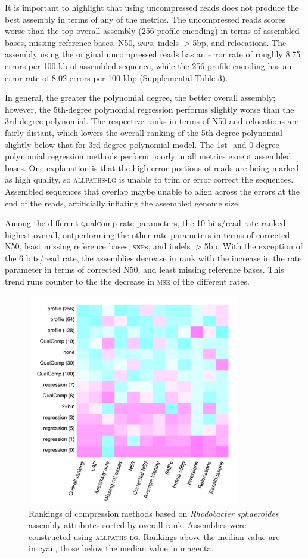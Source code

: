\documentclass{bioinfo}
\begin{document}
It is important to highlight that using uncompressed reads does not
produce the best assembly in terms of any of the metrics. The
uncompressed reads scores worse than the top overall assembly
(256-profile encoding) in terms of assembled bases, missing reference
bases, N50, \textsc{snp}s, indels $>$5bp, and relocations. The
assembly using the original uncompressed reads has an error rate of
roughly 8.75 errors per 100 kb of assembled sequence, while the
256-profile encoding has an error rate of 8.02 errors per 100 kbp
(Supplemental Table 3).

In general, the greater the polynomial degree, the better overall
assembly; however, the 5th-degree polynomial regression performs
slightly worse than the 3rd-degree polynomial. The respective ranks in
terms of N50 and relocations are fairly distant, which lowers the
overall ranking of the 5th-degree polynomial slightly below that for
3rd-degree polynomial model. The 1st- and 0-degree polynomial
regression methods perform poorly in all metrics except assembled
bases. One explanation is that the high error portions of reads are
being marked as high quality, so \textsc{allpaths-lg} is unable to
trim or error correct the sequences. Assembled sequences that overlap
maybe unable to align across the errors at the end of the reads,
artificially inflating the assembled genome size.

Among the different \textsc{q}ual\textsc{c}omp rate parameters, the 10
bits/read rate ranked highest overall, outperforming the other rate
parameters in terms of corrected N50, least missing reference bases,
\textsc{snp}s, and indels $>$5bp. With the exception of the 6
bits/read rate, the assemblies decrease in rank with the increase in
the rate parameter in terms of corrected N50, and least missing
reference bases. This trend runs counter to the the decrease in
\textsc{mse} of the different rates.


\begin{figure}[!tbp]
\centerline{\includegraphics[width=3.65in]{rhodo_assembly_results.pdf}}
\caption{Rankings of compression methods based on \textit{Rhodobacter
    sphaeroides} assembly attributes sorted by overall
  rank. Assemblies were constructed using \textsc{allpaths-lg}.
  Rankings above the median value are in cyan, those below the median
  value in magenta.}
  \label{fig:assembly_ranks}
\end{figure}
\end{document}
